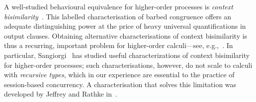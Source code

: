 
A well-studied behavioural equivalence for higher-order processes
is \emph{context bisimilarity}~\cite{San96H}. This 
labelled characterisation of %
barbed congruence 
offers an adequate distinguishing power at the price of heavy universal quantifications in output clauses.
Obtaining alternative 
characterisations of context bisimilarity
is thus a recurring, important problem 
for higher-order calculi---see, e.g.,~\cite{SangiorgiD:expmpa,San96H,JeffreyR05,DBLP:journals/cl/KoutavasH12,DBLP:journals/corr/Xu13a}. 
In particular, Sangiorgi~\cite{SangiorgiD:expmpa,San96H} has 
studied %
useful
characterizations of context bisimilarity
for higher-order processes; such 
characterisations, however,  %
do not scale to  
  calculi with \emph{recursive types}, which in our experience are essential to the practice of 
session-based concurrency. A characterisation  
that solves this limitation was developed by Jeffrey and Rathke in~\cite{JeffreyR05}.

\smallskip

